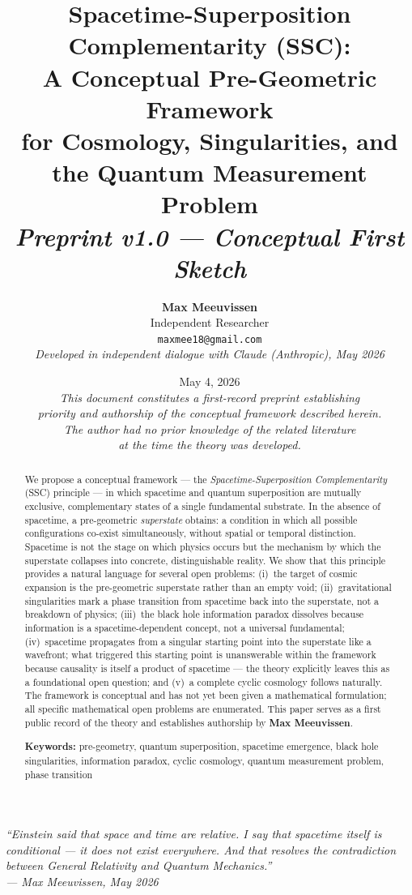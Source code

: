 \documentclass[12pt,a4paper]{article}
\title{%
  \textbf{Spacetime-Superposition Complementarity (SSC):}\\[0.3em]
  \textbf{A Conceptual Pre-Geometric Framework}\\[0.3em]
  \textbf{for Cosmology, Singularities, and}\\[0.3em]
  \textbf{the Quantum Measurement Problem}\\[1.2em]
  {\large\normalfont\itshape Preprint v1.0 — Conceptual First Sketch}
}
\author{%
  \textbf{Max Meeuvissen}\\[0.4em]
  \normalsize Independent Researcher\\[0.15em]
  \normalsize \texttt{maxmee18@gmail.com}\\[0.6em]
  \normalsize\itshape
  Developed in independent dialogue with Claude (Anthropic), May 2026
}
\date{%
  \normalsize May 4, 2026\\[0.4em]
  \small
  \textit{This document constitutes a first-record preprint establishing}\\
  \textit{priority and authorship of the conceptual framework described herein.}\\
  \textit{The author had no prior knowledge of the related literature}\\
  \textit{at the time the theory was developed.}
}
\begin{document}

\maketitle
\thispagestyle{fancy}

\vspace{0.6cm}
\begin{center}
\begin{minipage}{0.84\linewidth}
\small\itshape
``Einstein said that space and time are relative. I say that spacetime itself is
conditional — it does not exist everywhere. And that resolves the contradiction
between General Relativity and Quantum Mechanics.''\\[0.35em]
\upshape\small\hfill — Max Meeuvissen, May 2026
\end{minipage}
\end{center}
\vspace{0.4cm}

\begin{abstract}
\noindent
We propose a conceptual framework — the
\emph{Spacetime-Superposition Complementarity} (SSC) principle — in
which spacetime and quantum superposition are mutually exclusive,
complementary states of a single fundamental substrate.  In the
absence of spacetime, a pre-geometric \emph{superstate} obtains: a
condition in which all possible configurations co-exist
simultaneously, without spatial or temporal distinction.  Spacetime
is not the stage on which physics occurs but the mechanism by which
the superstate collapses into concrete, distinguishable reality.  We
show that this principle provides a natural language for several open
problems: (i)~the target of cosmic expansion is the pre-geometric
superstate rather than an empty void; (ii)~gravitational singularities
mark a phase transition from spacetime back into the superstate, not a
breakdown of physics; (iii)~the black hole information paradox
dissolves because information is a spacetime-dependent concept, not a
universal fundamental; (iv)~spacetime propagates from a singular
starting point into the superstate like a wavefront; what triggered
this starting point is unanswerable within the framework because
causality is itself a product of spacetime — the theory explicitly
leaves this as a foundational open question; and (v)~a complete cyclic
cosmology follows naturally.  The framework is
conceptual and has not yet been given a mathematical formulation; all
specific mathematical open problems are enumerated.  This paper serves
as a first public record of the theory and establishes authorship by
\textbf{Max Meeuvissen}.

\bigskip\noindent
\textbf{Keywords:} pre-geometry, quantum superposition, spacetime
emergence, black hole singularities, information paradox, cyclic
cosmology, quantum measurement problem, phase transition
\end{abstract}
\end{document}
